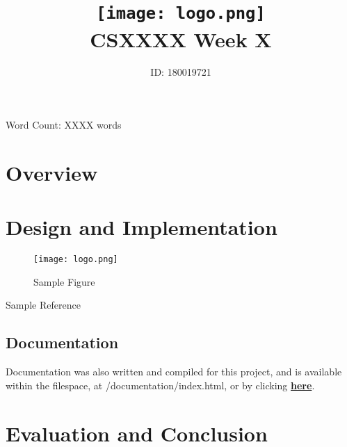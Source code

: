 \documentclass[hidelinks, a4paper]{article}
\title{\texttt{[image: logo.png]} \\ CSXXXX Week X}
\author{ID: 180019721}
\begin{document}
 
\maketitle
\begin{center}
Word Count: XXXX words
\end{center}
\tableofcontents

\newpage

\section{Overview}

\section{Design and Implementation}

\begin{figure}[H]
\centering
\texttt{[image: logo.png]}
\caption{Sample Figure}
\label{fig:image1}
\end{figure}

Sample Reference\cite{1}

\subsection{Documentation}
Documentation was also written and compiled for this project, and is available within the filespace, at /documentation/index.html, or by clicking \href{run:./documentation/index.html}{\textbf{here}}.

\section{Evaluation and Conclusion}

\newpage

\nocite{*}
\begingroup
\RaggedRight


\endgroup

\listoffigures
\end{document}
